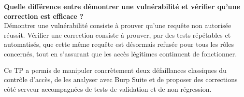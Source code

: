 \documentclass{rapportENSIAS}
\begin{document}
\textbf{Quelle différence entre démontrer une vulnérabilité et vérifier qu'une correction est efficace ?}\\
Démontrer une vulnérabilité consiste à prouver qu'une requête non autorisée réussit. Vérifier une correction consiste à prouver, par des tests répétables et automatisés, que cette même requête est désormais refusée pour tous les rôles concernés, tout en s'assurant que les accès légitimes continuent de fonctionner.

\medskip
Ce TP a permis de manipuler concrètement deux défaillances classiques du contrôle d'accès, de les analyser avec Burp Suite et de proposer des corrections côté serveur accompagnées de tests de validation et de non-régression.
\end{document}
